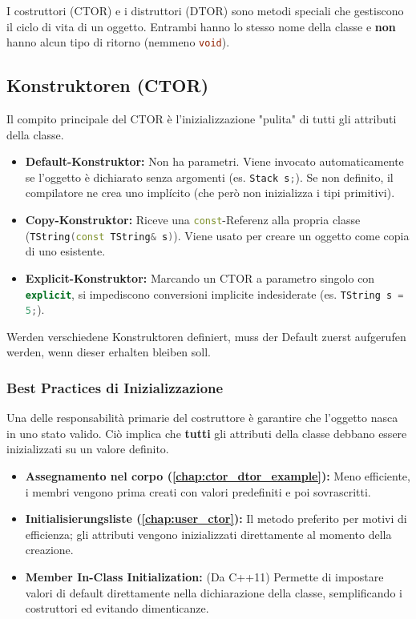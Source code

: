 I costruttori (CTOR) e i distruttori (DTOR) sono metodi speciali che gestiscono il ciclo di vita di un oggetto. Entrambi hanno lo stesso nome della classe e \textbf{non} hanno alcun tipo di ritorno (nemmeno \lstinline[language=C++]|void|).

\subsection{Konstruktoren (CTOR)}

Il compito principale del CTOR è l'inizializzazione "pulita" di tutti gli attributi della classe.

\begin{itemize}
    \item \textbf{Default-Konstruktor:} Non ha parametri. Viene invocato automaticamente se l'oggetto è dichiarato senza argomenti (es. \lstinline[language=C++]|Stack s;|). Se non definito, il compilatore ne crea uno implícito (che però non inizializza i tipi primitivi).
    \item \textbf{Copy-Konstruktor:} Riceve una \lstinline[language=C++]|const|-Referenz alla propria classe (\lstinline[language=C++]|TString(const TString& s)|). Viene usato per creare un oggetto come copia di uno esistente.
    \item \textbf{Explicit-Konstruktor:} Marcando un CTOR a parametro singolo con \lstinline[language=C++]|explicit|, si impediscono conversioni implicite indesiderate (es. \lstinline[language=C++]|TString s = 5;|).
\end{itemize}

Werden verschiedene Konstruktoren definiert, muss der Default zuerst aufgerufen werden, wenn dieser erhalten bleiben soll.

\subsubsection{Best Practices di Inizializzazione}
Una delle responsabilità primarie del costruttore è garantire che l'oggetto nasca in uno stato valido. Ciò implica che \textbf{tutti} gli attributi della classe debbano essere inizializzati su un valore definito.

\begin{itemize}
    \item \textbf{Assegnamento nel corpo (\ref{chap:ctor_dtor_example}):} Meno efficiente, i membri vengono prima creati con valori predefiniti e poi sovrascritti.
    \item \textbf{Initialisierungsliste (\ref{chap:user_ctor}):} Il metodo preferito per motivi di efficienza; gli attributi vengono inizializzati direttamente al momento della creazione.
    \item \textbf{Member In-Class Initialization:} (Da C++11) Permette di impostare valori di default direttamente nella dichiarazione della classe, semplificando i costruttori ed evitando dimenticanze.
\end{itemize}

